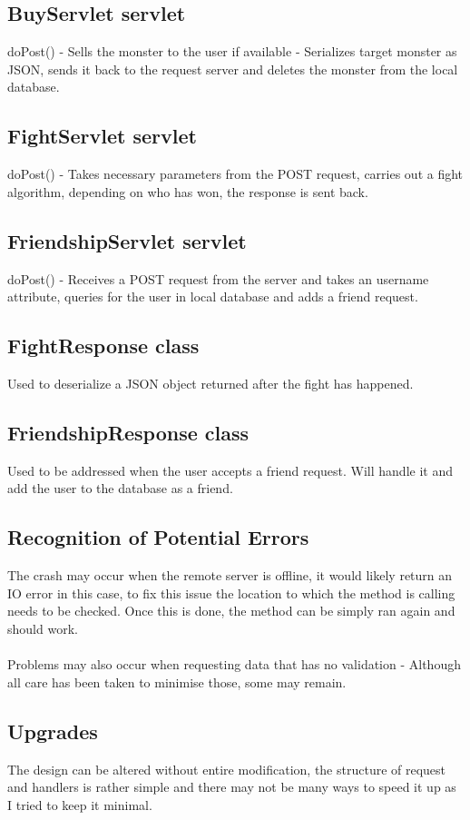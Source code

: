 \documentclass[titlepage]{article}
\begin{document}
{\subsection {BuyServlet servlet}
doPost() - Sells the monster to the user if available - Serializes target monster as JSON, sends it back to the request server and deletes the monster from the local database.
\subsection {FightServlet servlet}
doPost() - Takes necessary parameters from the POST request, carries out a fight algorithm, depending on who has won, the response is sent back.
\subsection {FriendshipServlet servlet}
doPost() - Receives a POST request from the server and takes an username attribute, queries for the user in local database and adds a friend request.
\subsection {FightResponse class}
Used to deserialize a JSON object returned after the fight has happened.
\subsection {FriendshipResponse class}
Used to be addressed when the user accepts a friend request. Will handle it and add the user to the database as a friend.
\subsection {Recognition of Potential Errors}
The crash may occur when the remote server is offline, it would likely return an IO error in this case, to fix this issue the location to which the method is calling needs to be checked. Once this is done, the method can be simply ran again and should work.
\\
\\
Problems may also occur when requesting data that has no validation - Although all care has been taken to minimise those, some may remain.
\subsection {Upgrades}
The design can be altered without entire modification, the structure of request and handlers is rather simple and there may not be many ways to speed it up as I tried to keep it minimal. 
}
\end{document}
